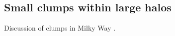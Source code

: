 \subsection{Small clumps within large halos}
Discussion of clumps in Milky Way \cite{Belotsky_2014}.